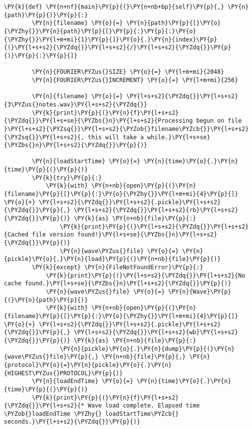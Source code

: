 \begin{Verbatim}[commandchars=\\\{\}]
    \PY{k}{def} \PY{n+nf}{main}\PY{p}{(}\PY{n+nb+bp}{self}\PY{p}{,} \PY{n}{path}\PY{p}{)}\PY{p}{:}
        \PY{n}{filename} \PY{o}{=} \PY{n}{path}\PY{p}{[}\PY{o}{\PYZhy{}}\PY{n}{path}\PY{p}{[}\PY{p}{:}\PY{p}{:}\PY{o}{\PYZhy{}}\PY{l+m+mi}{1}\PY{p}{]}\PY{o}{.}\PY{n}{index}\PY{p}{(}\PY{l+s+s2}{\PYZdq{}}\PY{l+s+s2}{/}\PY{l+s+s2}{\PYZdq{}}\PY{p}{)}\PY{p}{:}\PY{p}{]}

        \PY{n}{FOURIER\PYZus{}SIZE} \PY{o}{=} \PY{l+m+mi}{2048}
        \PY{n}{FOURIER\PYZus{}INCREMENT} \PY{o}{=} \PY{l+m+mi}{256}

        \PY{n}{filename} \PY{o}{=} \PY{l+s+s2}{\PYZdq{}}\PY{l+s+s2}{3\PYZus{}notes.wav}\PY{l+s+s2}{\PYZdq{}}
        \PY{k}{print}\PY{p}{(}\PY{n}{f}\PY{l+s+s2}{\PYZdq{}}\PY{l+s+se}{\PYZbs{}n}\PY{l+s+s2}{Processing begun on file }\PY{l+s+s2}{\PYZsq{}}\PY{l+s+s2}{\PYZob{}filename\PYZcb{}}\PY{l+s+s2}{\PYZsq{}}\PY{l+s+s2}{, this will take a while.}\PY{l+s+se}{\PYZbs{}n}\PY{l+s+s2}{\PYZdq{}}\PY{p}{)}

        \PY{n}{loadStartTime} \PY{o}{=} \PY{n}{time}\PY{o}{.}\PY{n}{time}\PY{p}{(}\PY{p}{)}
        \PY{k}{try}\PY{p}{:}
            \PY{k}{with} \PY{n+nb}{open}\PY{p}{(}\PY{n}{filename}\PY{p}{[}\PY{p}{:}\PY{o}{\PYZhy{}}\PY{l+m+mi}{4}\PY{p}{]} \PY{o}{+} \PY{l+s+s2}{\PYZdq{}}\PY{l+s+s2}{.pickle}\PY{l+s+s2}{\PYZdq{}}\PY{p}{,} \PY{l+s+s2}{\PYZdq{}}\PY{l+s+s2}{rb}\PY{l+s+s2}{\PYZdq{}}\PY{p}{)} \PY{k}{as} \PY{n+nb}{file}\PY{p}{:}
                \PY{k}{print}\PY{p}{(}\PY{l+s+s2}{\PYZdq{}}\PY{l+s+s2}{Cached file version found!}\PY{l+s+se}{\PYZbs{}n}\PY{l+s+s2}{\PYZdq{}}\PY{p}{)}
                \PY{n}{wave\PYZus{}file} \PY{o}{=} \PY{n}{pickle}\PY{o}{.}\PY{n}{load}\PY{p}{(}\PY{n+nb}{file}\PY{p}{)}
        \PY{k}{except} \PY{n}{FileNotFoundError}\PY{p}{:}
            \PY{k}{print}\PY{p}{(}\PY{l+s+s2}{\PYZdq{}}\PY{l+s+s2}{No cache found.}\PY{l+s+se}{\PYZbs{}n}\PY{l+s+s2}{\PYZdq{}}\PY{p}{)}
            \PY{n}{wave\PYZus{}file} \PY{o}{=} \PY{n}{Wave}\PY{p}{(}\PY{n}{path}\PY{p}{)}
            \PY{k}{with} \PY{n+nb}{open}\PY{p}{(}\PY{n}{filename}\PY{p}{[}\PY{p}{:}\PY{o}{\PYZhy{}}\PY{l+m+mi}{4}\PY{p}{]} \PY{o}{+} \PY{l+s+s2}{\PYZdq{}}\PY{l+s+s2}{.pickle}\PY{l+s+s2}{\PYZdq{}}\PY{p}{,} \PY{l+s+s2}{\PYZdq{}}\PY{l+s+s2}{wb}\PY{l+s+s2}{\PYZdq{}}\PY{p}{)} \PY{k}{as} \PY{n+nb}{file}\PY{p}{:}
                \PY{n}{pickle}\PY{o}{.}\PY{n}{dump}\PY{p}{(}\PY{n}{wave\PYZus{}file}\PY{p}{,} \PY{n+nb}{file}\PY{p}{,} \PY{n}{protocol}\PY{o}{=}\PY{n}{pickle}\PY{o}{.}\PY{n}{HIGHEST\PYZus{}PROTOCOL}\PY{p}{)}
        \PY{n}{loadEndTime} \PY{o}{=} \PY{n}{time}\PY{o}{.}\PY{n}{time}\PY{p}{(}\PY{p}{)}
        \PY{k}{print}\PY{p}{(}\PY{n}{f}\PY{l+s+s2}{\PYZdq{}}\PY{l+s+s2}{* Wave load complete. Elapsed time \PYZob{}loadEndTime \PYZhy{} loadStartTime\PYZcb{} seconds.}\PY{l+s+s2}{\PYZdq{}}\PY{p}{)}


\end{Verbatim}
